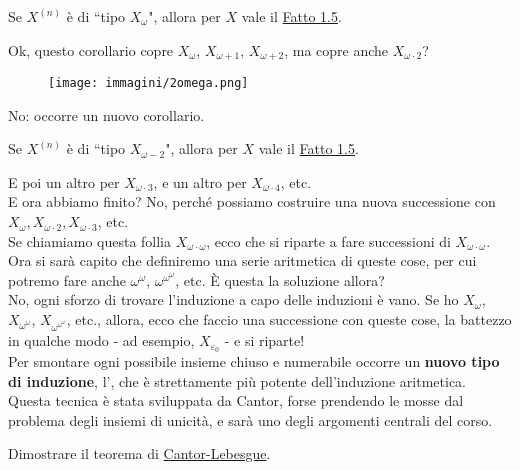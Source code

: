 \documentclass[11pt]{scrartcl}
\begin{document}
\begin{corollary}
Se $X^{(n)}$ è di ``tipo $X_\omega$", allora per $X$ vale il \hyperref[unicità]{Fatto 1.5}.
\end{corollary}

Ok, questo corollario copre $X_\omega$, $X_{\omega + 1}$, $X_{\omega + 2}$, ma copre anche $X_{\omega \cdot 2}$?
\pagebreak
\begin{center}
	\begin{figure}[h]
		\centering
		\texttt{[image: immagini/2omega.png]}
	\end{figure}
\end{center}

No: occorre un nuovo corollario.

\begin{corollary}
Se $X^{(n)}$ è di ``tipo $X_{\omega - 2}$", allora per $X$ vale il \hyperref[unicità]{Fatto 1.5}.
\end{corollary}

E poi un altro per $X_{\omega \cdot 3}$, e un altro per $X_{\omega \cdot 4}$, etc.\\
E ora abbiamo finito? No, perché possiamo costruire una nuova successione con $X_{\omega},X_{\omega \cdot 2},X_{\omega \cdot 3}$, etc.\\
Se chiamiamo questa follia $X_{\omega \cdot \omega}$, ecco che si riparte a fare successioni di $X_{\omega \cdot \omega}$. Ora si sarà capito che definiremo
una serie aritmetica di queste cose, per cui potremo fare anche $\omega^\omega$, $\omega^{\omega^{\omega}}$, etc. È questa la soluzione allora?\\
No, ogni sforzo di trovare l'induzione a capo delle induzioni è vano. Se ho $X_{\omega}$, $X_{\omega^\omega}$, $X_{\omega^{\omega^{\omega}}}$, etc., allora,
ecco che faccio una successione con queste cose, la battezzo in qualche modo - ad esempio, $X_{\varepsilon_0}$ - e si riparte!\\
Per smontare ogni possibile insieme chiuso e numerabile occorre un \textbf{nuovo tipo di induzione}, l', che è strettamente più potente dell'induzione aritmetica.
Questa tecnica è stata sviluppata da Cantor, forse prendendo le mosse dal problema degli insiemi di unicità, e sarà uno degli argomenti centrali del corso.

\begin{exercise}
Dimostrare il teorema di \hyperref[CL]{Cantor-Lebesgue}.
\end{exercise}
\end{document}
